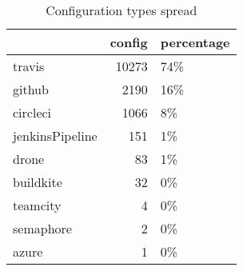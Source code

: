 \begin {table}[!htbp]

\caption{Configuration types spread}
\label{table_config_types}
\begin{tabular}{lrl}
\hline
{} &  config & percentage \\ \hline

travis          &   10273 &        74\% \\ \hline
github          &    2190 &        16\% \\ \hline
circleci        &    1066 &         8\% \\ \hline
jenkinsPipeline &     151 &         1\% \\ \hline
drone           &      83 &         1\% \\ \hline
buildkite       &      32 &         0\% \\ \hline
teamcity        &       4 &         0\% \\ \hline
semaphore       &       2 &         0\% \\ \hline
azure           &       1 &         0\% \\ \hline

\end{tabular}
\end{table}
